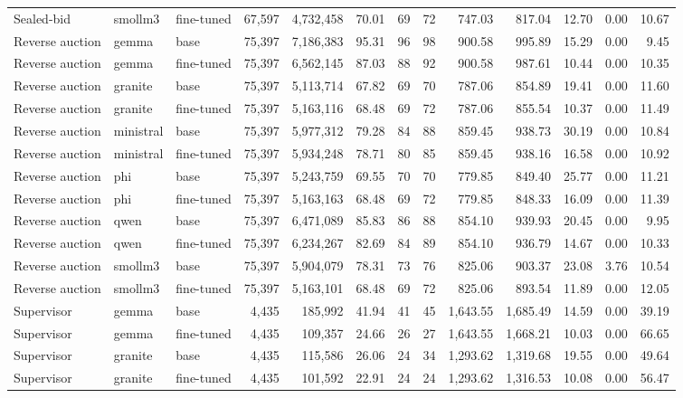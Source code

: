 \begin{table}[t]
\begin{tabular}{lllrrrrrrrrrr}
Sealed-bid & smollm3 & fine-tuned & 67,597 & 4,732,458 & 70.01 & 69 & 72 & 747.03 & 817.04 & 12.70 & 0.00 & 10.67 \\
Reverse auction & gemma & base & 75,397 & 7,186,383 & 95.31 & 96 & 98 & 900.58 & 995.89 & 15.29 & 0.00 & 9.45 \\
Reverse auction & gemma & fine-tuned & 75,397 & 6,562,145 & 87.03 & 88 & 92 & 900.58 & 987.61 & 10.44 & 0.00 & 10.35 \\
Reverse auction & granite & base & 75,397 & 5,113,714 & 67.82 & 69 & 70 & 787.06 & 854.89 & 19.41 & 0.00 & 11.60 \\
Reverse auction & granite & fine-tuned & 75,397 & 5,163,116 & 68.48 & 69 & 72 & 787.06 & 855.54 & 10.37 & 0.00 & 11.49 \\
Reverse auction & ministral & base & 75,397 & 5,977,312 & 79.28 & 84 & 88 & 859.45 & 938.73 & 30.19 & 0.00 & 10.84 \\
Reverse auction & ministral & fine-tuned & 75,397 & 5,934,248 & 78.71 & 80 & 85 & 859.45 & 938.16 & 16.58 & 0.00 & 10.92 \\
Reverse auction & phi & base & 75,397 & 5,243,759 & 69.55 & 70 & 70 & 779.85 & 849.40 & 25.77 & 0.00 & 11.21 \\
Reverse auction & phi & fine-tuned & 75,397 & 5,163,163 & 68.48 & 69 & 72 & 779.85 & 848.33 & 16.09 & 0.00 & 11.39 \\
Reverse auction & qwen & base & 75,397 & 6,471,089 & 85.83 & 86 & 88 & 854.10 & 939.93 & 20.45 & 0.00 & 9.95 \\
Reverse auction & qwen & fine-tuned & 75,397 & 6,234,267 & 82.69 & 84 & 89 & 854.10 & 936.79 & 14.67 & 0.00 & 10.33 \\
Reverse auction & smollm3 & base & 75,397 & 5,904,079 & 78.31 & 73 & 76 & 825.06 & 903.37 & 23.08 & 3.76 & 10.54 \\
Reverse auction & smollm3 & fine-tuned & 75,397 & 5,163,101 & 68.48 & 69 & 72 & 825.06 & 893.54 & 11.89 & 0.00 & 12.05 \\
Supervisor & gemma & base & 4,435 & 185,992 & 41.94 & 41 & 45 & 1,643.55 & 1,685.49 & 14.59 & 0.00 & 39.19 \\
Supervisor & gemma & fine-tuned & 4,435 & 109,357 & 24.66 & 26 & 27 & 1,643.55 & 1,668.21 & 10.03 & 0.00 & 66.65 \\
Supervisor & granite & base & 4,435 & 115,586 & 26.06 & 24 & 34 & 1,293.62 & 1,319.68 & 19.55 & 0.00 & 49.64 \\
Supervisor & granite & fine-tuned & 4,435 & 101,592 & 22.91 & 24 & 24 & 1,293.62 & 1,316.53 & 10.08 & 0.00 & 56.47 \\

\end{tabular}
\end{table}
